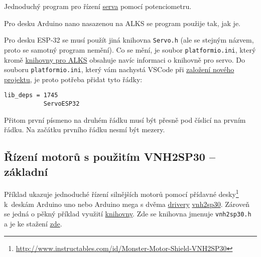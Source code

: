 Jednoduchý program pro řízení \hyperref[servo]{serva} pomocí potenciometru.

Pro desku Arduino nano nasazenou na ALKS se program použije tak, jak je. 

Pro desku ESP-32 se musí použít jiná knihovna {\tt Servo.h} (ale se stejným názvem, proto se samotný program nemění). 
Co se mění, je soubor {\tt platformio.ini}, který kromě \hyperref[alks:knihovna]{knihovny pro ALKS} obsahuje navíc informaci o knihovně pro servo. Do souboru  {\tt platformio.ini}, který vám nachystá VSCode při 
 \hyperref[vsc:newproject]{založení nového projektu}, je proto potřeba přidat tyto řádky: 
\begin{verbatim}
lib_deps = 1745
           ServoESP32
\end{verbatim}
 Přitom první písmeno  na druhém řádku musí být přesně pod číslicí  na prvním řádku. Na začátku prvního řádku nesmí být mezery. 






\label{prog:vnh2sp30} \label{prog:knihovna} 
\subsection{Řízení motorů s použitím VNH2SP30 -- základní} 

Příklad ukazuje jednoduché řízení silnějších motorů pomocí přídavné 
desky\footnote{\url{http://www.instructables.com/id/Monster-Motor-Shield-VNH2SP30}
	} k~deskám Arduino uno nebo Arduino mega  s dvěma \hyperref[driver]{drivery}
  \hyperref[vnh2sp30]{vnh2sp30}.  Zároveň se jedná o pěkný příklad využití \hyperref[knihovna]{knihovny}. Zde se knihovna jmenuje {\tt vnh2sp30.h} a je ke stažení 
  \href{https://github.com/RoboticsBrno/RoboticsBrno-guides/tree/RoboticsManual/RoboticsManual/priklady_c}{zde}.






